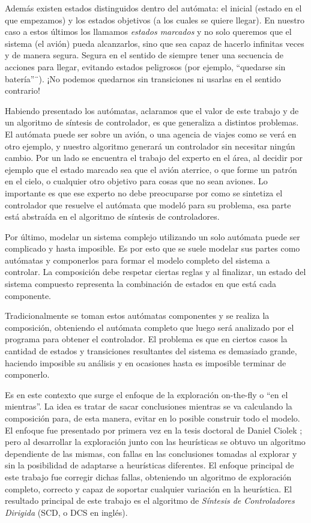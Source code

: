 Además existen estados distinguidos dentro del autómata: el inicial (estado en el que empezamos) y los estados objetivos (a los cuales se quiere llegar). En nuestro caso a estos últimos los llamamos \textit{estados marcados} y no solo queremos que el sistema (el avión) pueda alcanzarlos, sino que sea capaz de hacerlo infinitas veces y de manera segura. Segura en el sentido de siempre tener una secuencia de acciones para llegar, evitando estados peligrosos (por ejemplo, ``quedarse sin batería''¨). ¡No podemos quedarnos sin transiciones ni usarlas en el sentido contrario!

Habiendo presentado los autómatas, aclaramos que el valor de este trabajo y de un algoritmo de síntesis de controlador, es que generaliza a distintos problemas. El autómata puede ser sobre un avión, o una agencia de viajes como se verá en otro ejemplo, y nuestro algoritmo generará un controlador sin necesitar ningún cambio. Por un lado se encuentra el trabajo del experto en el área, al decidir por ejemplo que el estado marcado sea que el avión aterrice, o que forme un patrón en el cielo, o cualquier otro objetivo para cosas que no sean aviones. Lo importante es que ese experto no debe preocuparse por como se sintetiza el controlador que resuelve el autómata que modeló para su problema, esa parte está abstraída en el algoritmo de síntesis de controladores.

Por último, modelar un sistema complejo utilizando un solo autómata puede ser complicado y hasta imposible. Es por esto que se suele modelar sus partes como autómatas y componerlos para formar el modelo completo del sistema a controlar. La composición debe respetar ciertas reglas y al finalizar, un estado del sistema compuesto representa la combinación de estados en que está cada componente.

Tradicionalmente se toman estos autómatas componentes y se realiza la composición, obteniendo el autómata completo que luego será analizado por el programa para obtener el controlador. El problema es que en ciertos casos la cantidad de estados y transiciones resultantes del sistema es demasiado grande, haciendo imposible su análisis y en ocasiones hasta es imposible terminar de componerlo.

Es en este contexto que surge el enfoque de la exploración on-the-fly o ``en el mientras''. La idea es tratar de sacar conclusiones mientras se va calculando la composición para, de esta manera, evitar en lo posible construir todo el modelo. El enfoque fue presentado por primera vez en la tesis doctoral de Daniel Ciolek \cite{tesisDani}; pero al desarrollar la exploración junto con las heurísticas se obtuvo un algoritmo dependiente de las mismas, con fallas en las conclusiones tomadas al explorar y sin la posibilidad de adaptarse a heurísticas diferentes. El enfoque principal de este trabajo fue corregir dichas fallas, obteniendo un algoritmo de exploración completo, correcto y capaz de soportar cualquier variación en la heurística. El resultado principal de este trabajo es el algoritmo de \textit{Síntesis de Controladores Dirigida} (SCD, o DCS en inglés).

